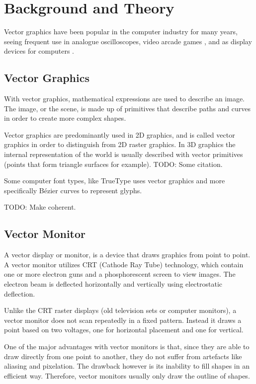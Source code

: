 \chapter{Background and Theory}

Vector graphics have been popular in the computer industry for many years, seeing frequent use in analogue oscilloscopes, video arcade games \cite{astroids}, and as display devices for computers \cite{ibm2250}.

\section{Vector Graphics}

With vector graphics, mathematical expressions are used to describe an image.
The image, or the scene, is made up of primitives that describe paths and curves in order to create more complex shapes.

Vector graphics are predominantly used in 2D graphics, and is called vector graphics in order to distinguish from 2D raster graphics. In 3D graphics the internal representation of the world is usually described with vector primitives (points that form triangle surfaces for example). TODO: Some citation.

Some computer font types, like TrueType uses vector graphics and more specifically Bézier curves to represent glyphs\cite{truetype}.


TODO: Make coherent.


\section{Vector Monitor}
A vector display or monitor, is a device that draws graphics from point to point. A vector monitor utilizes CRT (Cathode Ray Tube) technology, which contain one or more electron guns and a phosphorescent screen to view images. The electron beam is deflected horizontally and vertically using electrostatic deflection. \cite{vector-monitor}

Unlike the CRT raster displays (old television sets or computer monitors), a vector monitor does not scan repeatedly in a fixed pattern. Instead it draws a point based on two voltages, one for horizontal placement and one for vertical.

One of the major advantages with vector monitors is that, since they are able to draw directly from one point to another, they do not suffer from artefacts like aliasing and pixelation. The drawback however is its inability to fill shapes in an efficient way. Therefore, vector monitors usually only draw the outline of shapes.


